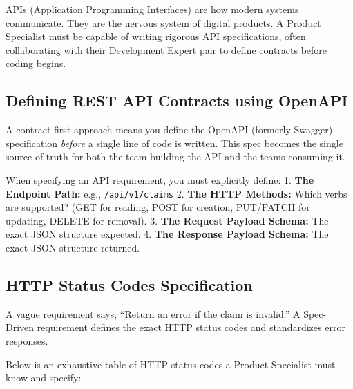 APIs (Application Programming Interfaces) are how modern systems
communicate. They are the nervous system of digital products. A Product
Specialist must be capable of writing rigorous API specifications, often
collaborating with their Development Expert pair to define contracts
before coding begins.

\subsection{Defining REST API Contracts using
OpenAPI}\label{defining-rest-api-contracts-using-openapi}

A contract-first approach means you define the OpenAPI (formerly
Swagger) specification \emph{before} a single line of code is written.
This spec becomes the single source of truth for both the team building
the API and the teams consuming it.

When specifying an API requirement, you must explicitly define: 1.
\textbf{The Endpoint Path:} e.g., \texttt{/api/v1/claims} 2. \textbf{The
HTTP Methods:} Which verbs are supported? (GET for reading, POST for
creation, PUT/PATCH for updating, DELETE for removal). 3. \textbf{The
Request Payload Schema:} The exact JSON structure expected. 4.
\textbf{The Response Payload Schema:} The exact JSON structure returned.

\subsection{HTTP Status Codes
Specification}\label{http-status-codes-specification}

A vague requirement says, ``Return an error if the claim is invalid.'' A
Spec-Driven requirement defines the exact HTTP status codes and
standardizes error responses.

Below is an exhaustive table of HTTP status codes a Product Specialist
must know and specify:

